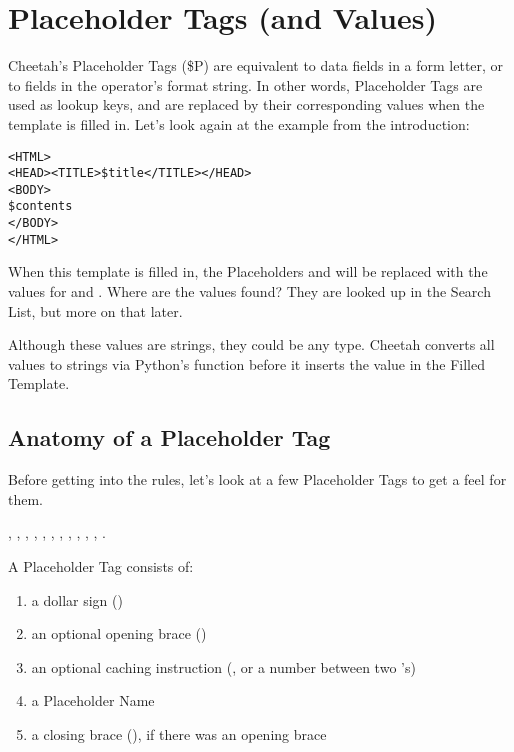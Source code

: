 \section{Placeholder Tags (and Values)}

Cheetah's Placeholder Tags (\$P) are equivalent to data fields in a form
letter, or to  fields in the \code{\%} operator's format string.
In other words, Placeholder Tags are used as lookup keys, and are replaced by
their corresponding values when the template is filled in.  Let's look again at
the example from the introduction:

\begin{verbatim}
<HTML>
<HEAD><TITLE>$title</TITLE></HEAD>
<BODY>
$contents
</BODY>
</HTML>
\end{verbatim}

When this template is filled in, the Placeholders  and
 will be replaced with the values for 
and .  Where are the values found?  They are looked up in the
Search List, but more on that later.

Although these values are strings, they could be any type.  Cheetah
converts all values to strings via Python's  function before it
inserts the value in the Filled Template.


\subsection{Anatomy of a Placeholder Tag}

Before getting into the rules, let's look at a few Placeholder Tags to get a
feel for them.

, \code{\$\_}, , , ,
, , , ,
,
,
.


A Placeholder Tag consists of: 

\begin{enumerate}
\item  a dollar sign (\code{\$})
\item  an optional opening brace (\code{\{})
\item  an optional caching instruction (\code{*}, or a number between two 
     \code{*}'s)
\item  a Placeholder Name
\item  a closing brace (\code{\}}), if there was an opening brace
\end{enumerate}


